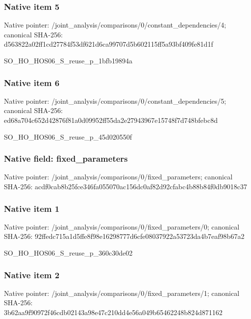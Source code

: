 \documentclass[10pt,a4paper]{article}
\begin{document}
\subsubsection{Native item 5}
Native pointer: /joint\_\allowbreak{}analysis/comparisons/0/constant\_\allowbreak{}dependencies/4; canonical SHA-256: d563822a02ff1cd27784f53df621d6ca99707d5b602115ff5a93bf409fe81d1f

\begingroup\raggedright\sloppy SO\_\allowbreak{}HO\_\allowbreak{}HOS06\_\allowbreak{}S\_\allowbreak{}reuse\_\allowbreak{}p\_\allowbreak{}1bfb19894a\par\endgroup

\subsubsection{Native item 6}
Native pointer: /joint\_\allowbreak{}analysis/comparisons/0/constant\_\allowbreak{}dependencies/5; canonical SHA-256: ed68a704c652d42876f81a0d09952ff55da2e27943967e15748f7d748bfebc8d

\begingroup\raggedright\sloppy SO\_\allowbreak{}HO\_\allowbreak{}HOS06\_\allowbreak{}S\_\allowbreak{}reuse\_\allowbreak{}p\_\allowbreak{}45d020550f\par\endgroup

\subsubsection{Native field: fixed\_\allowbreak{}parameters}
Native pointer: /joint\_\allowbreak{}analysis/comparisons/0/fixed\_\allowbreak{}parameters; canonical SHA-256: acdf0cab8b25fce346fa055070ac156dc0af82d92cfabc4b88b84f0db9018c37

\subsubsection{Native item 1}
Native pointer: /joint\_\allowbreak{}analysis/comparisons/0/fixed\_\allowbreak{}parameters/0; canonical SHA-256: 92ffedc715a1d5ffe8f98e16298777d6cfe08037922a53723da4b7eaf98b67a2

\begingroup\raggedright\sloppy SO\_\allowbreak{}HO\_\allowbreak{}HOS06\_\allowbreak{}S\_\allowbreak{}reuse\_\allowbreak{}p\_\allowbreak{}360c30de02\par\endgroup

\subsubsection{Native item 2}
Native pointer: /joint\_\allowbreak{}analysis/comparisons/0/fixed\_\allowbreak{}parameters/1; canonical SHA-256: 3b62aa9f90972f46cdb02143a98e47c210dd4e56a049b65462248b824d871162
\end{document}
